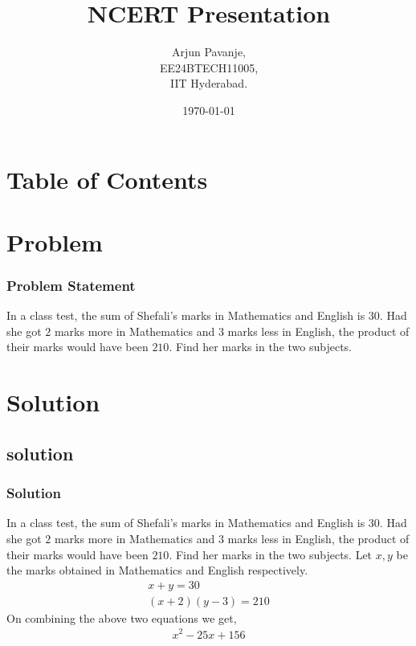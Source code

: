 \documentclass{beamer}
\title{NCERT Presentation}
\author{Arjun Pavanje,\\ EE24BTECH11005,\\IIT Hyderabad.\\}
\date{\today}
\providecommand{\brak}[1]{\ensuremath{\left(#1\right)}}
\theoremstyle{remark}
\numberwithin{equation}{section}
\begin{document}
    \begin{frame}
      \titlepage
    \end{frame}

    \section*{Table of Contents}
    \begin{frame}
      \tableofcontents
    \end{frame}
    \section{Problem}
    \begin{frame}
      \frametitle{Problem Statement}

      In a class test, the sum of Shefali's marks in Mathematics and English is $30$. Had she got $2$ marks more in Mathematics and $3$ marks less in English, the product of their marks would have been $210$. Find her marks in the two subjects. \newline

    \end{frame}
    \section{Solution}
    \subsection{solution}
    \begin{frame}
      \frametitle{Solution}
      In a class test, the sum of Shefali's marks in Mathematics and English is $30$. Had she got $2$ marks more in Mathematics and $3$ marks less in English, the product of their marks would have been $210$. Find her marks in the two subjects. \newline
      Let $x, y$ be the marks obtained in Mathematics and English respectively. 
      \begin{align}
        x + y = 30\\
        \brak{x+2}\brak{y-3} = 210
      \end{align}
      On combining the above two equations we get,
      \begin{align}
        x^2 - 25x + 156
      \end{align} 
    \end{frame}
\end{document}

